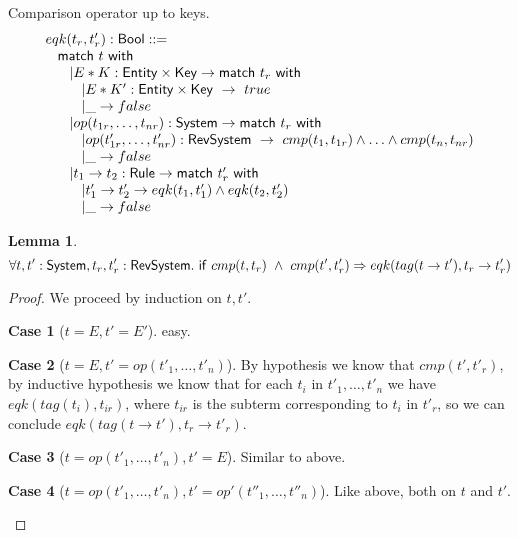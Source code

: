 \documentclass{article}[12pt,a4paper]
\theoremstyle{definition}
\newtheorem{case}{Case}
\newtheorem{lemma}{Lemma}
\begin{document}
Comparison operator up to keys.
\[
  \begin{array}{l}
    eqk(t_r,t'_r):\mathsf{Bool} ::=\\
    \hspace{2ex}\mathsf{match}~t~\mathsf{with}\\
    \hspace{4ex}| E*K: \mathsf{Entity}\times\mathsf{Key} \rightarrow \mathsf{match}~t_r~\mathsf{with}\\
    \hspace{6ex}| E*K': \mathsf{Entity}\times\mathsf{Key}~\rightarrow~true\\
    \hspace{6ex}| \_ \rightarrow false\\
    \hspace{4ex}| op(t_{1r},\ldots,t_{nr}): \mathsf{System} \rightarrow \mathsf{match}~t_r~\mathsf{with}\\
    \hspace{6ex}| op(t'_{1r},\ldots,t'_{nr}):
    \mathsf{RevSystem}~\rightarrow~cmp(t_1,t_{1r}) \wedge\ldots\wedge cmp(t_n,t_{nr})\\
    \hspace{6ex}| \_ \rightarrow false\\
    \hspace{4ex}| t_1 \rightarrow t_2 : \mathsf{Rule}\rightarrow \mathsf{match}~t'_r~\mathsf{with}\\
    \hspace{6ex}| t'_1 \rightarrow t'_2 \rightarrow
    eqk(t_1,t_1')\wedge eqk(t_2,t_2')\\
    \hspace{6ex}| \_ \rightarrow false

  \end{array}
\]

\begin{lemma}
  \[
    \forall t,t':\mathsf{System}, t_r,t'_r:\mathsf{RevSystem}.~\mathsf{if}~cmp(t,t_r)~\wedge~
    cmp(t',t'_r) \Rightarrow eqk(tag(t\rightarrow t'),t_r\rightarrow t'_r)
  \]
\end{lemma}
\begin{proof}
  We proceed by induction on $t,t'$.\\
  \begin{case}[$t=E,t'=E'$]
    easy.
  \end{case}
  \begin{case}[$t=E,t'=op(t'_1,\ldots,t'_n)$]
    By hypothesis we know that $cmp(t',t'_r)$, by inductive hypothesis we
    know that for each $t_i$ in $t'_1,\ldots,t'_n$ we have 
    $eqk(tag(t_i), t_{ir})$, where $t_{ir}$ is the subterm corresponding to
    $t_i$ in $t'_r$, so we can conclude
    $eqk(tag(t\rightarrow t'), t_r\rightarrow t'_r)$.
  \end{case}
  \begin{case}[$t=op(t'_1,\ldots,t'_n),t'=E$]
    Similar to above.
  \end{case}
  \begin{case}[$t=op(t'_1,\ldots,t'_n),t'=op'(t''_1,\ldots,t''_n)$]
    Like above, both on $t$ and $t'$.
  \end{case}

\end{proof}
\end{document}
